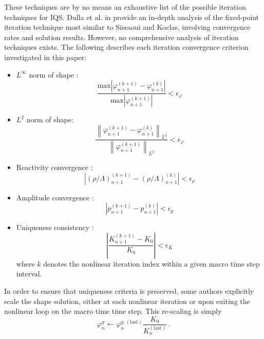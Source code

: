 \documentclass{elsarticle}
\def\answer#1#2{{\color{blue}
     \begin{tabular}{|l|}
       \hline{ #1}\\\hline{ #2}\\\hline
     \end{tabular}}}
\def\comm#1{{\color{magenta}
     \begin{tabular}{|l|}
       \hline #1 \\\hline
     \end{tabular}}}
\newcommand{\be}{\begin{equation}}
\newcommand{\ee}{\end{equation}}
\newcommand{\norm}[1]{\left\lVert#1\right\rVert_{L^2}}
\begin{document}
These techniques are by no means an exhaustive list of the possible iteration techniques for IQS. Dulla et al. in \cite{Dulla2008} provide an 
in-depth analysis of the fixed-point iteration technique most similar to Sissaoui and Koclas, involving convergence rates and solution results.  
However, no comprehensive analysis of iteration techniques exists. The following describes 
each iteration convergence criterion investigated in this paper:

\begin{itemize}
\item $L^\infty$ norm of shape \cite{Monier_diss}: 
\[
\frac{\text{max}\left|\varphi_{n+1}^{(k+1)} - \varphi_{n+1}^{(k)}\right|}{\text{max}\left|\varphi_{n+1}^{(k+1)}\right|} < \epsilon_{\varphi}
\]
\item $L^2$ norm of shape: 
\[
\frac{\norm{\varphi_{n+1}^{(k+1)} - \varphi_{n+1}^{(k)}}}{\norm{\varphi_{n+1}^{(k+1)}}} < \epsilon_{\varphi}
\]
\item Reactivity convergence \cite{Monier_diss}: 
\[
\left|\left(\rho/\Lambda\right)^{(k+1)}_{n+1} - \left(\rho/\Lambda\right)^{(k)}_{n+1}\right| < \epsilon_{\rho}
\]
\item Amplitude convergence \cite{Monier_diss}: 
\[
\left|p_{n+1}^{(k+1)} - p_{n+1}^{(k)}\right| < \epsilon_p
\]
\item Uniqueness consistency \cite{Monier_diss}: 
\[
\left|\frac{K_{n+1}^{(k+1)} - K_0}{K_0}\right| < \epsilon_K
\]
where $k$ denotes the nonlinear iteration index within a given macro time step interval.
\end{itemize}

In order to ensure that uniqueness criteria is preserved, some authors \cite{Monier_diss,Dulla2008} explicitly scale the shape solution, 
either at each nonlinear iteration or upon exiting the nonlinear loop on the macro time time step. This re-scaling is simply
\be 
\varphi^{g}_n \leftarrow \varphi^{g,(\text{last})}_n \frac{K_0}{K^{(\text{last})}_{n}} \,.
\label{eq:shape_scale}
\ee

\end{document}
